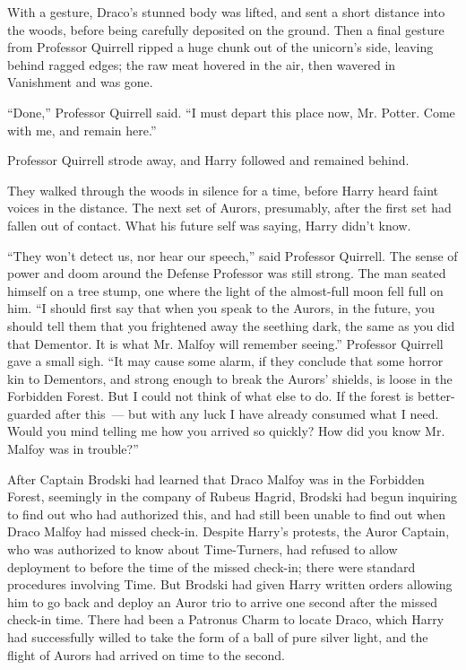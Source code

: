 With a gesture, Draco's stunned body was lifted, and sent a short distance into the woods, before being carefully deposited on the ground. Then a final gesture from Professor Quirrell ripped a huge chunk out of the unicorn's side, leaving behind ragged edges; the raw meat hovered in the air, then wavered in Vanishment and was gone.

``Done,'' Professor Quirrell said. ``I must depart this place now, Mr. Potter. Come with me, and remain here.''

Professor Quirrell strode away, and Harry followed and remained behind.

They walked through the woods in silence for a time, before Harry heard faint voices in the distance. The next set of Aurors, presumably, after the first set had fallen out of contact. What his future self was saying, Harry didn't know.

``They won't detect us, nor hear our speech,'' said Professor Quirrell. The sense of power and doom around the Defense Professor was still strong. The man seated himself on a tree stump, one where the light of the almost-full moon fell full on him. ``I should first say that when you speak to the Aurors, in the future, you should tell them that you frightened away the seething dark, the same as you did that Dementor. It is what Mr. Malfoy will remember seeing.'' Professor Quirrell gave a small sigh. ``It may cause some alarm, if they conclude that some horror kin to Dementors, and strong enough to break the Aurors' shields, is loose in the Forbidden Forest. But I could not think of what else to do. If the forest is better-guarded after this~--- but with any luck I have already consumed what I need. Would you mind telling me how you arrived so quickly? How did you know Mr. Malfoy was in trouble?''

After Captain Brodski had learned that Draco Malfoy was in the Forbidden Forest, seemingly in the company of Rubeus Hagrid, Brodski had begun inquiring to find out who had authorized this, and had still been unable to find out when Draco Malfoy had missed check-in. Despite Harry's protests, the Auror Captain, who was authorized to know about Time-Turners, had refused to allow deployment to before the time of the missed check-in; there were standard procedures involving Time. But Brodski had given Harry written orders allowing him to go back and deploy an Auror trio to arrive one second after the missed check-in time. There had been a Patronus Charm to locate Draco, which Harry had successfully willed to take the form of a ball of pure silver light, and the flight of Aurors had arrived on time to the second.

